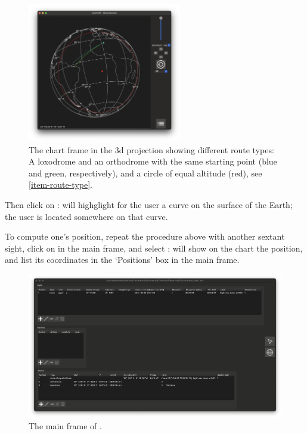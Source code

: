 \documentclass{ol-softwaremanual}
\begin{document}
  \begin{figure}
    \includegraphics[width=0.6\textwidth]{figures/route-types.png}
    \caption{
      \label{fig-route-types}
      The chart frame in the 3d projection showing different route types: A loxodrome and an orthodrome with the same starting point (blue and green, respectively), and a circle of equal altitude (red), see \cref{item-route-type}. 
    }
    \end{figure}

  Then click on : \thel will highglight for the user a curve on the surface of the Earth; the user is located somewhere on that curve. 

To compute one's position, repeat the procedure above with another sextant sight, click on  in the main frame, and select : \thel will show on the chart the position, and list its coordinates in the `Positions' box in the main frame. 

\begin{figure}
  \centering
  \includegraphics[width=1\textwidth]{figures/list-frame.png}
  \caption{
    \label{fig-list-frame}
    The main frame of \thel. 
  }
  \end{figure}
\end{document}
